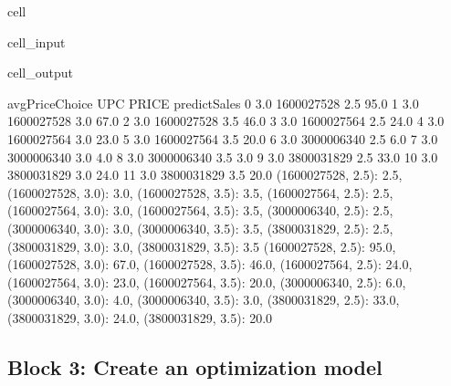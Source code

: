 \documentclass[letterpaper,10pt,english]{jupyterBook}
\begin{document}
\begin{sphinxuseclass}{cell}
\begin{sphinxVerbatimInput}
\begin{sphinxuseclass}{cell_input}
\begin{sphinxVerbatim}[commandchars=\\\{\}]
\end{sphinxVerbatim}

\end{sphinxuseclass}\end{sphinxVerbatimInput}
\begin{sphinxVerbatimOutput}

\begin{sphinxuseclass}{cell_output}
\begin{sphinxVerbatim}[commandchars=\\\{\}]
    avgPriceChoice         UPC  PRICE  predictSales
0              3.0  1600027528    2.5          95.0
1              3.0  1600027528    3.0          67.0
2              3.0  1600027528    3.5          46.0
3              3.0  1600027564    2.5          24.0
4              3.0  1600027564    3.0          23.0
5              3.0  1600027564    3.5          20.0
6              3.0  3000006340    2.5           6.0
7              3.0  3000006340    3.0           4.0
8              3.0  3000006340    3.5           3.0
9              3.0  3800031829    2.5          33.0
10             3.0  3800031829    3.0          24.0
11             3.0  3800031829    3.5          20.0
\PYGZob{}(1600027528, 2.5): 2.5, (1600027528, 3.0): 3.0, (1600027528, 3.5): 3.5, (1600027564, 2.5): 2.5, (1600027564, 3.0): 3.0, (1600027564, 3.5): 3.5, (3000006340, 2.5): 2.5, (3000006340, 3.0): 3.0, (3000006340, 3.5): 3.5, (3800031829, 2.5): 2.5, (3800031829, 3.0): 3.0, (3800031829, 3.5): 3.5\PYGZcb{}
\PYGZob{}(1600027528, 2.5): 95.0, (1600027528, 3.0): 67.0, (1600027528, 3.5): 46.0, (1600027564, 2.5): 24.0, (1600027564, 3.0): 23.0, (1600027564, 3.5): 20.0, (3000006340, 2.5): 6.0, (3000006340, 3.0): 4.0, (3000006340, 3.5): 3.0, (3800031829, 2.5): 33.0, (3800031829, 3.0): 24.0, (3800031829, 3.5): 20.0\PYGZcb{}
\end{sphinxVerbatim}

\end{sphinxuseclass}\end{sphinxVerbatimOutput}

\end{sphinxuseclass}

\subsection{Block 3: Create an optimization model}
\label{\detokenize{docs/Case1_5_Module2B_Retail_Price_Optimization_Script:block-3-create-an-optimization-model}}
\end{document}
